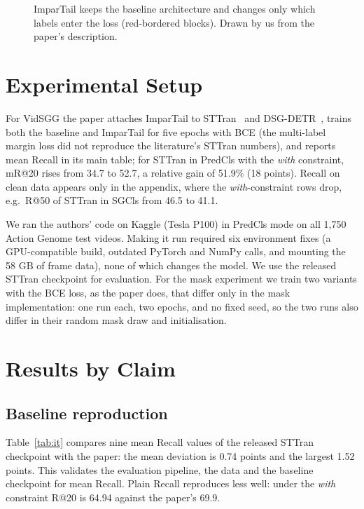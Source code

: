 \documentclass[conference,a4paper]{IEEEtran}
\begin{document}
\begin{figure}[!t]
\centering
\resizebox{\columnwidth}{!}{}
\caption{ImparTail keeps the baseline architecture and changes only which labels enter the loss (red-bordered blocks). Drawn by us from the paper's description.}
\label{fig:impartail}
\end{figure}

\section{Experimental Setup}
For VidSGG the paper attaches ImparTail to STTran~\cite{sttran} and
DSG-DETR~\cite{dsgdetr}, trains both the baseline and ImparTail for five epochs with BCE
(the multi-label margin loss did not reproduce the literature's STTran numbers), and
reports mean Recall in its main table; for STTran in PredCls with the \emph{with}
constraint, mR@20 rises from 34.7 to 52.7, a relative gain of 51.9\% (18 points). Recall on
clean data appears only in the appendix, where the \emph{with}-constraint rows drop, e.g.\
R@50 of STTran in SGCls from 46.5 to 41.1.

We ran the authors' code on Kaggle (Tesla P100) in PredCls mode on all 1,750 Action Genome
test videos. Making it run required six environment fixes (a GPU-compatible build, outdated PyTorch and NumPy calls, and mounting the 58 GB of frame data), none of which changes the model. We use the
released STTran checkpoint for evaluation. For the mask experiment we train two variants
with the BCE loss, as the paper does, that differ only in the mask implementation: one run
each, two epochs, and no fixed seed, so the two runs also differ in their random mask draw
and initialisation.

\section{Results by Claim}
\subsection{Baseline reproduction}
\label{sec:i1}
Table~\ref{tab:it} compares nine mean Recall values of the released STTran checkpoint with
the paper: the mean deviation is 0.74 points and the largest 1.52 points. This validates
the evaluation pipeline, the data and the baseline checkpoint for mean Recall. Plain Recall
reproduces less well: under the \emph{with} constraint R@20 is 64.94 against the paper's
69.9.
\end{document}
